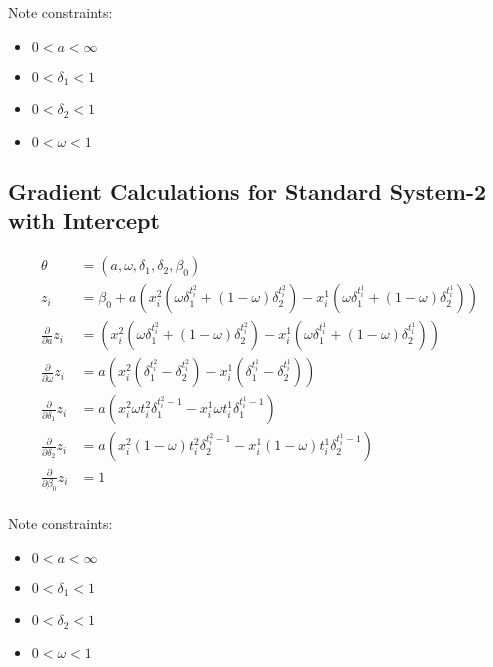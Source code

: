 \documentclass[12pt]{article}
\begin{document}
Note constraints:

\begin{itemize}
    \item{$0 < a < \infty$}
    \item{$0 < \delta_1 < 1$}
    \item{$0 < \delta_2 < 1$}
    \item{$0 < \omega < 1$}
\end{itemize}

\subsection{Gradient Calculations for Standard System-2 with Intercept}

\begin{align*}
  \theta &= (a, \omega, \delta_1, \delta_2, \beta_0) \\
  z_i &= \beta_0 + a (
    x^2_i (\omega \delta_1^{t^2_i} + (1 - \omega) \delta_2^{t^2_i})
    - x^1_i (\omega \delta_1^{t^1_i} + (1 - \omega) \delta_2^{t^1_i})
  ) \\
  \frac{\partial}{\partial a} z_i
    &= (
      x^2_i (\omega \delta_1^{t^2_i} + (1 - \omega) \delta_2^{t^2_i})
      - x^1_i (\omega \delta_1^{t^1_i} + (1 - \omega) \delta_2^{t^1_i})
    ) \\
  \frac{\partial}{\partial \omega} z_i
    &= a (
      x^2_i (\delta_1^{t^2_i} - \delta_2^{t^2_i})
      - x^1_i (\delta_1^{t^1_i} - \delta_2^{t^1_i})
    ) \\
  \frac{\partial}{\partial \delta_1} z_i
    &= a (
      x^2_i \omega t^2_i \delta_1^{t^2_i - 1}
      - x^1_i \omega t^1_i \delta_1^{t^1_i - 1}
    ) \\
  \frac{\partial}{\partial \delta_2} z_i
    &= a (
      x^2_i (1 - \omega) t^2_i \delta_2^{t^2_i - 1}
      - x^1_i (1 - \omega) t^1_i \delta_2^{t^1_i - 1}
    ) \\
  \frac{\partial}{\partial \beta_0} z_i &= 1 \\
\end{align*}

Note constraints:

\begin{itemize}
    \item{$0 < a < \infty$}
    \item{$0 < \delta_1 < 1$}
    \item{$0 < \delta_2 < 1$}
    \item{$0 < \omega < 1$}
\end{itemize}
\end{document}
